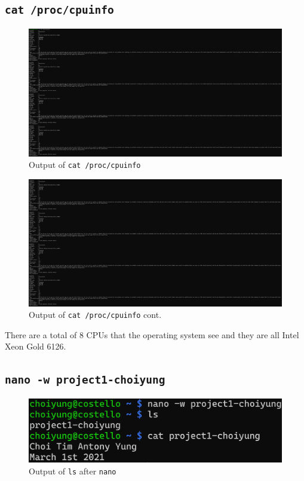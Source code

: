 \documentclass{article}
\begin{document}
\subsection{\texttt{cat /proc/cpuinfo}}
\begin{figure}[H]
  \caption{Output of \texttt{cat /proc/cpuinfo}}
  \centering
  \includegraphics[width=\textwidth]{ECE4310_proj1_part1_4a.png}
\end{figure}
\begin{figure}[H]
  \caption{Output of \texttt{cat /proc/cpuinfo} cont.}
  \centering
  \includegraphics[width=\textwidth]{ECE4310_proj1_part1_4b.png}
\end{figure}

There are a total of 8 CPUs that the operating system see and they are all Intel Xeon Gold 6126.

\subsection{\texttt{nano -w project1-choiyung}}
\begin{figure}[H]
  \caption{Output of \texttt{ls} after \texttt{nano}}
  \centering
  \includegraphics[width=\textwidth]{ECE4310_proj1_part1_5.png}
\end{figure}
\end{document}
